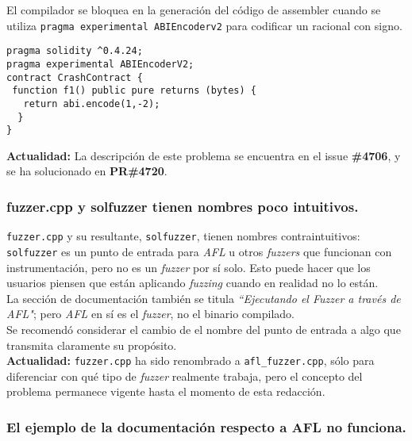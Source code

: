 El compilador se bloquea en la generación del código de assembler cuando se utiliza \texttt{pragma experimental ABIEncoderv2} para codificar un racional con signo.\\

\begin{lstlisting}[language=Solidity, caption={Código de ejemplo fallo ABIEncoderV2}]
pragma solidity ^0.4.24;
pragma experimental ABIEncoderV2;
contract CrashContract {
 function f1() public pure returns (bytes) {
   return abi.encode(1,-2);
  }
}
\end{lstlisting}

\textbf{Actualidad:} La descripción de este problema se encuentra en el issue \textbf{\#4706}\cite{GHI4706}, y se ha solucionado en \textbf{PR\#4720}\cite{GHPR4720}.\\


\subsubsection{fuzzer.cpp y solfuzzer tienen nombres poco intuitivos.}

\texttt{fuzzer.cpp} y su resultante, \texttt{solfuzzer}, tienen nombres contraintuitivos: \texttt{solfuzzer} es un punto de entrada para \textit{AFL} u otros \textit{fuzzers} que funcionan con instrumentación, pero no es un \textit{fuzzer} por sí solo. Esto puede hacer que los usuarios piensen que están aplicando \textit{fuzzing} cuando en realidad no lo están.\\

La sección de documentación también se titula \textit{``Ejecutando el Fuzzer a través de AFL"}\cite{ReadTheDocsSolidityAFL}; pero \textit{AFL} en sí es el \textit{fuzzer}, no el binario compilado.\\

Se recomendó considerar el cambio de el nombre del punto de entrada a algo que transmita claramente su propósito.\\

\textbf{Actualidad:} \texttt{fuzzer.cpp} ha sido renombrado a \texttt{afl\_fuzzer.cpp}, sólo para diferenciar con qué tipo de \textit{fuzzer} realmente trabaja, pero el concepto del problema permanece vigente hasta el momento de esta redacción.\\


\subsubsection{El ejemplo de la documentación respecto a AFL no funciona.}

